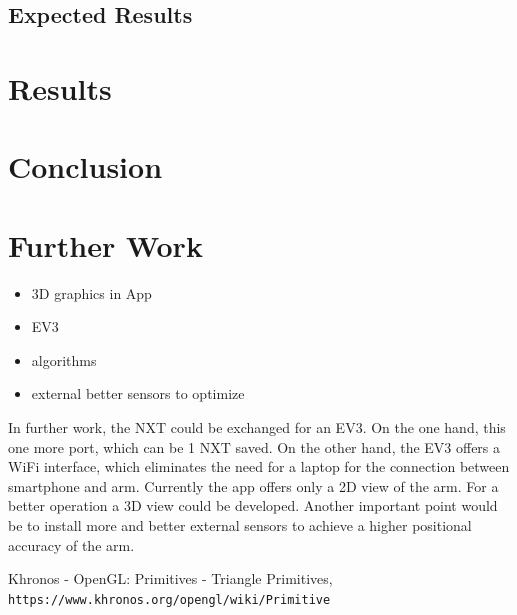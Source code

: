 \documentclass[conference]{IEEEtran}
\begin{document}
\subsection{Expected Results}\label{sec:expectedresults}

\section{Results}

\section{Conclusion}

\section{Further Work}
\begin{itemize}
	\item 3D graphics in App
	\item EV3
	\item algorithms
	\item external better sensors to optimize
\end{itemize}
In further work, the NXT could be exchanged for an EV3. On the one hand, this one more port, which can be 1 NXT saved. On the other hand, the EV3 offers a WiFi interface, which eliminates the need for a laptop for the connection between smartphone and arm.
Currently the app offers only a 2D view of the arm. For a better operation a 3D view could be developed.
Another important point would be to install more and better external sensors to achieve a higher positional accuracy of the arm.

\begin{thebibliography}{00}
Khronos - OpenGL: Primitives - Triangle Primitives,
\\\texttt{https://www.khronos.org/opengl/wiki/Primitive}
\end{thebibliography}

\listoftodos
\end{document}
